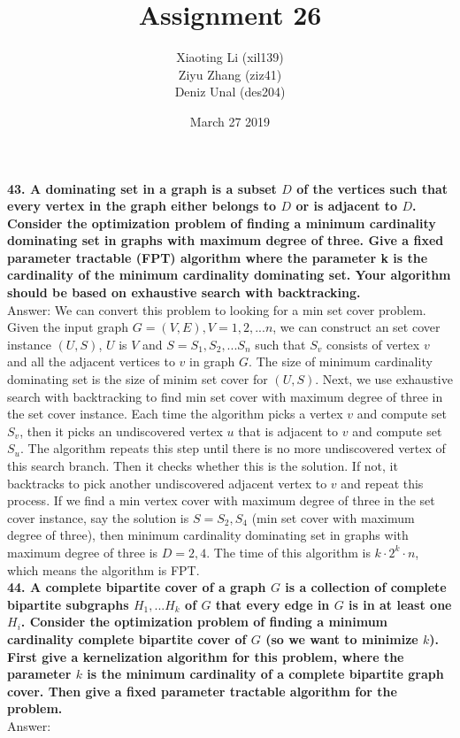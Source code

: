 \documentclass{article}
\title{Assignment 26}
\author{Xiaoting Li (xil139) \\
Ziyu Zhang (ziz41) \\
Deniz Unal (des204)}
\date{March 27 2019}
\begin{document}
\maketitle
\noindent
\textbf{43. A dominating set in a graph is a subset $D$ of the vertices such that every vertex in the graph either belongs to $D$ or is adjacent to $D$. Consider the optimization problem of finding a minimum cardinality dominating set in graphs with maximum degree of three. Give a fixed parameter tractable (FPT) algorithm where the parameter k is the cardinality of the minimum cardinality dominating set. Your algorithm should be based on exhaustive search with backtracking.} \\ \newline
Answer: We can convert this problem to looking for a min set cover problem. Given the input graph $G = (V, E), V = {1, 2, ... n}$, we can construct an set cover instance $(U, S)$, $U$ is $V$ and $S = {S_1, S_2, ... S_n}$ such that $S_v$ consists of vertex $v$ and all the adjacent vertices to $v$ in graph $G$. The size of minimum cardinality dominating set is the size of minim set cover for $(U, S)$. Next, we use exhaustive search with backtracking to find min set cover with maximum degree of three in the set cover instance. Each time the algorithm picks a vertex $v$ and compute set $S_v$, then it picks an undiscovered vertex $u$ that is adjacent to $v$ and compute set $S_u$. The algorithm repeats this step until there is no more undiscovered vertex of this search branch. Then it checks whether this is the solution. If not, it backtracks to pick another undiscovered adjacent vertex to $v$ and repeat this process. If we find a min vertex cover with maximum degree of three in the set cover instance, say the solution is $S = {S_2, S_4}$ (min set cover with maximum degree of three), then minimum cardinality dominating set in graphs with maximum degree of three is $D= {2, 4}$. The time of this algorithm is $k \cdot 2^k \cdot n$, which means the algorithm is FPT.\\ \newline
\textbf{44. A complete bipartite cover of a graph $G$ is a collection of complete bipartite subgraphs $H_1, ... H_k$ of $G$ that every edge in $G$ is in at least one $H_i$. Consider the optimization problem of finding a minimum cardinality complete bipartite cover of $G$ (so we want to minimize $k$). First give a kernelization algorithm for this problem, where the parameter $k$ is the minimum cardinality of a complete bipartite graph cover. Then give a fixed parameter tractable algorithm for the problem.} \\ \newline
Answer: 
\end{document}

